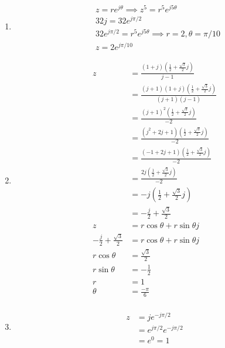 \documentclass[10pt,a4paper, margin=1in]{article}
\begin{document}
\begin{enumerate}
\begin{enumerate}
        
    \item \begin{align*}
        & z = re^{j\theta} \implies z^5 = r^5e^{j5\theta} \\
        & 32j = 32e^{j\pi/2} \\
        & 32e^{j\pi/2} = r^5e^{j5\theta} \implies r = 2, \theta = \pi/10 \\
        & z = 2e^{j\pi/10}
    \end{align*}
    \item \begin{align*}
        z & = \frac{(1 + j) (\frac{1}{2} + \frac{\sqrt{3}}{2} j)}{j - 1} \\
        & = \frac{(j + 1) (1 + j) (\frac{1}{2} + \frac{\sqrt{3}}{2} j)}{(j + 1) (j - 1)} \\
        & = \frac{{(j + 1)}^2 (\frac{1}{2} + \frac{\sqrt{3}}{2} j)}{-2} \\
        & = \frac{(j^2 + 2j + 1) (\frac{1}{2} + \frac{\sqrt{3}}{2} j)}{-2} \\
        & = \frac{(-1 + 2j + 1) (\frac{1}{2} + \frac{\sqrt{3}}{2} j)}{-2} \\
        & = \frac{2j (\frac{1}{2} + \frac{\sqrt{3}}{2} j)}{-2} \\
        & = -j (\frac{1}{2} + \frac{\sqrt{3}}{2} j) \\
        & = - \frac{j}{2} + \frac{\sqrt{3}}{2} \\
        z & = r \cos\theta + r \sin\theta j \\
        - \frac{j}{2} + \frac{\sqrt{3}}{2} & = r \cos\theta + r \sin\theta j \\
        r\cos\theta & = \frac{\sqrt{3}}{2} \\
        r\sin\theta & = - \frac{1}{2} \\
        r & = 1 \\
        \theta & = \frac{-\pi}{6} \\
    \end{align*}
    \item \begin{align*}
        z & = je^{-j\pi/2} \\
        & = e^{j\pi/2}e^{-j\pi/2} \\
        & = e^0 = 1
    \end{align*}
    \end{enumerate}


\end{enumerate}
\end{document}
